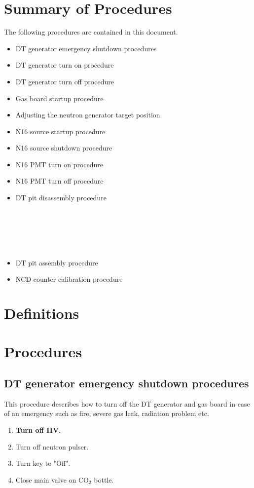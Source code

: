 \section{Summary of Procedures}

The following procedures are contained in this document.

\begin{itemize}
\item DT generator emergency shutdown procedures
\item DT generator turn on procedure
\item DT generator turn off procedure
\item Gas board startup procedure
\item Adjusting the neutron generator target position
\item N16 source startup procedure
\item N16 source shutdown procedure
\item N16 PMT turn on procedure
\item N16 PMT turn off procedure
\item DT pit disassembly procedure \\ \\ \\ \\ \\ \\
\item DT pit assembly procedure 
\item NCD counter calibration procedure
\end{itemize} 


\section{Definitions}

\section{Procedures}

\subsection{ DT generator emergency shutdown procedures}

This procedure describes how to turn off the DT generator and gas board in case of an emergency such as fire, severe gas leak, radiation problem etc.
\begin{enumerate}
\item \CheckBox[name=dtesp1]{} {\bf Turn off HV.}
\item \CheckBox[name=dtesp2]{} Turn off neutron pulser.
\item \CheckBox[name=dtesp3]{} Turn key to "Off".
\item \CheckBox[name=dtesp4]{} Close main valve on CO$_2$ bottle.
\end{enumerate}

